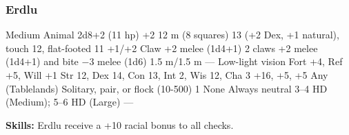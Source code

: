 \subsubsection{Erdlu}
\begin{MonsterStats}
{Medium Animal}
{2d8+2 (11 hp)}
{+2}
{12 m (8 squares)}
{13 (+2 Dex, +1 natural), touch 12, flat-footed 11}
{+1/+2}
{Claw +2 melee (1d4+1)}
{2 claws +2 melee (1d4+1) and bite $-3$ melee (1d6)}
{1.5 m/1.5 m}
{---}
{Low-light vision}
{Fort +4, Ref +5, Will +1}
{Str 12, Dex 14, Con 13, Int 2, Wis 12, Cha 3}
{ +16,  +5,  +5}
{}
{Any (Tablelands)}
{Solitary, pair, or flock (10-500)}
{1}
{None}
{Always neutral}
{3--4 HD (Medium); 5--6 HD (Large)}
{---}
\end{MonsterStats}

\textbf{Skills:} Erdlu receive a +10 racial bonus to all  checks.
